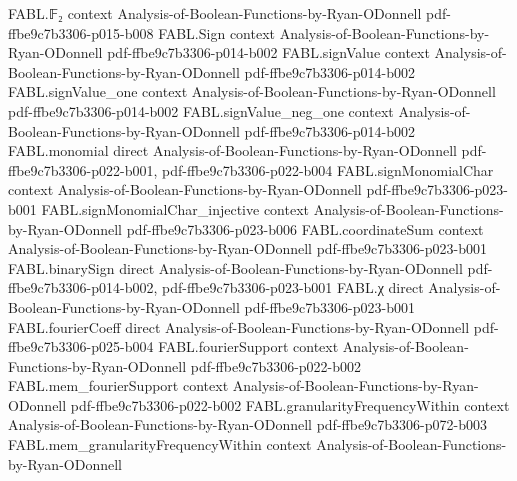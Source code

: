 \begin{theorem}
\label{FABL.card_negOnePivotal_le_selectedWidth}
\leanok
{}
\proofstep
  {FABL.𝔽₂}
  {context}
  {Analysis-of-Boolean-Functions-by-Ryan-ODonnell}
  {pdf-ffbe9c7b3306-p015-b008}
\proofstep
  {FABL.Sign}
  {context}
  {Analysis-of-Boolean-Functions-by-Ryan-ODonnell}
  {pdf-ffbe9c7b3306-p014-b002}
\proofstep
  {FABL.signValue}
  {context}
  {Analysis-of-Boolean-Functions-by-Ryan-ODonnell}
  {pdf-ffbe9c7b3306-p014-b002}
\proofstep
  {FABL.signValue_one}
  {context}
  {Analysis-of-Boolean-Functions-by-Ryan-ODonnell}
  {pdf-ffbe9c7b3306-p014-b002}
\proofstep
  {FABL.signValue_neg_one}
  {context}
  {Analysis-of-Boolean-Functions-by-Ryan-ODonnell}
  {pdf-ffbe9c7b3306-p014-b002}
\proofstep
  {FABL.monomial}
  {direct}
  {Analysis-of-Boolean-Functions-by-Ryan-ODonnell}
  {pdf-ffbe9c7b3306-p022-b001,
    pdf-ffbe9c7b3306-p022-b004}
\proofstep
  {FABL.signMonomialChar}
  {context}
  {Analysis-of-Boolean-Functions-by-Ryan-ODonnell}
  {pdf-ffbe9c7b3306-p023-b001}
\proofstep
  {FABL.signMonomialChar_injective}
  {context}
  {Analysis-of-Boolean-Functions-by-Ryan-ODonnell}
  {pdf-ffbe9c7b3306-p023-b006}
\proofstep
  {FABL.coordinateSum}
  {context}
  {Analysis-of-Boolean-Functions-by-Ryan-ODonnell}
  {pdf-ffbe9c7b3306-p023-b001}
\proofstep
  {FABL.binarySign}
  {direct}
  {Analysis-of-Boolean-Functions-by-Ryan-ODonnell}
  {pdf-ffbe9c7b3306-p014-b002,
    pdf-ffbe9c7b3306-p023-b001}
\proofstep
  {FABL.χ}
  {direct}
  {Analysis-of-Boolean-Functions-by-Ryan-ODonnell}
  {pdf-ffbe9c7b3306-p023-b001}
\proofstep
  {FABL.fourierCoeff}
  {direct}
  {Analysis-of-Boolean-Functions-by-Ryan-ODonnell}
  {pdf-ffbe9c7b3306-p025-b004}
\proofstep
  {FABL.fourierSupport}
  {context}
  {Analysis-of-Boolean-Functions-by-Ryan-ODonnell}
  {pdf-ffbe9c7b3306-p022-b002}
\proofstep
  {FABL.mem_fourierSupport}
  {context}
  {Analysis-of-Boolean-Functions-by-Ryan-ODonnell}
  {pdf-ffbe9c7b3306-p022-b002}
\proofstep
  {FABL.granularityFrequencyWithin}
  {context}
  {Analysis-of-Boolean-Functions-by-Ryan-ODonnell}
  {pdf-ffbe9c7b3306-p072-b003}
\proofstep
  {FABL.mem_granularityFrequencyWithin}
  {context}
  {Analysis-of-Boolean-Functions-by-Ryan-ODonnell}

\end{theorem}
